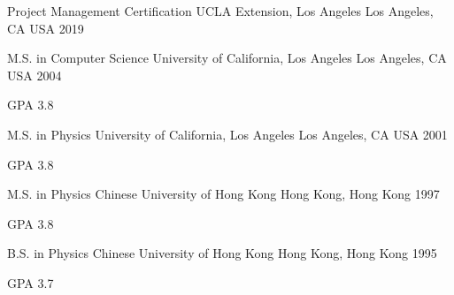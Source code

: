 

\begin{cventries}


 \cventry
    {Project Management Certification} %
    {UCLA Extension, Los Angeles} %
    {Los Angeles, CA USA} %
    {2019} %
    {}


  \cventry
    {M.S. in Computer Science} %
    {University of California, Los Angeles} %
    {Los Angeles, CA USA} %
    {2004} %
    {
      \begin{cvitems} %
        \item {GPA 3.8}
      \end{cvitems}
    }

	\cventry
    {M.S. in Physics} %
    {University of California, Los Angeles} %
    {Los Angeles, CA USA} %
    {2001} %
    {
      \begin{cvitems} %
        \item {GPA 3.8}
      \end{cvitems}
    }	
	
	\cventry
    {M.S. in Physics} %
    {Chinese University of Hong Kong} %
    {Hong Kong, Hong Kong} %
    {1997} %
    {
      \begin{cvitems} %
        \item {GPA 3.8}
      \end{cvitems}
    }	

	\cventry
    {B.S. in Physics} %
    {Chinese University of Hong Kong} %
    {Hong Kong, Hong Kong} %
    {1995} %
    {
      \begin{cvitems} %
        \item {GPA 3.7}
      \end{cvitems}
    }	

\end{cventries}
